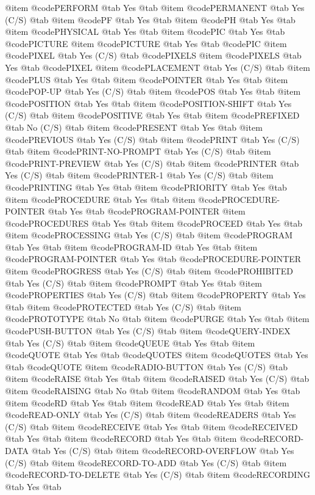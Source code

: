 @item @code{PERFORM} @tab Yes @tab
@item @code{PERMANENT} @tab Yes	(C/S) @tab
@item @code{PF} @tab Yes @tab
@item @code{PH} @tab Yes @tab
@item @code{PHYSICAL} @tab Yes @tab
@item @code{PIC} @tab Yes @tab @code{PICTURE}
@item @code{PICTURE} @tab Yes @tab @code{PIC}
@item @code{PIXEL} @tab Yes	(C/S) @tab @code{PIXELS}
@item @code{PIXELS} @tab Yes @tab @code{PIXEL}
@item @code{PLACEMENT} @tab Yes	(C/S) @tab
@item @code{PLUS} @tab Yes @tab
@item @code{POINTER} @tab Yes @tab
@item @code{POP-UP} @tab Yes	(C/S) @tab
@item @code{POS} @tab Yes @tab
@item @code{POSITION} @tab Yes @tab
@item @code{POSITION-SHIFT} @tab Yes	(C/S) @tab
@item @code{POSITIVE} @tab Yes @tab
@item @code{PREFIXED} @tab No	(C/S) @tab
@item @code{PRESENT} @tab Yes @tab
@item @code{PREVIOUS} @tab Yes	(C/S) @tab
@item @code{PRINT} @tab Yes	(C/S) @tab
@item @code{PRINT-NO-PROMPT} @tab Yes	(C/S) @tab
@item @code{PRINT-PREVIEW} @tab Yes	(C/S) @tab
@item @code{PRINTER} @tab Yes	(C/S) @tab
@item @code{PRINTER-1} @tab Yes	(C/S) @tab
@item @code{PRINTING} @tab Yes @tab
@item @code{PRIORITY} @tab Yes @tab
@item @code{PROCEDURE} @tab Yes @tab
@item @code{PROCEDURE-POINTER} @tab Yes @tab @code{PROGRAM-POINTER}
@item @code{PROCEDURES} @tab Yes @tab
@item @code{PROCEED} @tab Yes @tab
@item @code{PROCESSING} @tab Yes	(C/S) @tab
@item @code{PROGRAM} @tab Yes @tab
@item @code{PROGRAM-ID} @tab Yes @tab
@item @code{PROGRAM-POINTER} @tab Yes @tab @code{PROCEDURE-POINTER}
@item @code{PROGRESS} @tab Yes	(C/S) @tab
@item @code{PROHIBITED} @tab Yes	(C/S) @tab
@item @code{PROMPT} @tab Yes @tab
@item @code{PROPERTIES} @tab Yes	(C/S) @tab
@item @code{PROPERTY} @tab Yes @tab
@item @code{PROTECTED} @tab Yes	(C/S) @tab
@item @code{PROTOTYPE} @tab No @tab
@item @code{PURGE} @tab Yes @tab
@item @code{PUSH-BUTTON} @tab Yes	(C/S) @tab
@item @code{QUERY-INDEX} @tab Yes	(C/S) @tab
@item @code{QUEUE} @tab Yes @tab
@item @code{QUOTE} @tab Yes @tab @code{QUOTES}
@item @code{QUOTES} @tab Yes @tab @code{QUOTE}
@item @code{RADIO-BUTTON} @tab Yes	(C/S) @tab
@item @code{RAISE} @tab Yes @tab
@item @code{RAISED} @tab Yes	(C/S) @tab
@item @code{RAISING} @tab No @tab
@item @code{RANDOM} @tab Yes @tab
@item @code{RD} @tab Yes @tab
@item @code{READ} @tab Yes @tab
@item @code{READ-ONLY} @tab Yes	(C/S) @tab
@item @code{READERS} @tab Yes	(C/S) @tab
@item @code{RECEIVE} @tab Yes @tab
@item @code{RECEIVED} @tab Yes @tab
@item @code{RECORD} @tab Yes @tab
@item @code{RECORD-DATA} @tab Yes	(C/S) @tab
@item @code{RECORD-OVERFLOW} @tab Yes (C/S) @tab
@item @code{RECORD-TO-ADD} @tab Yes	(C/S) @tab
@item @code{RECORD-TO-DELETE} @tab Yes	(C/S) @tab
@item @code{RECORDING} @tab Yes @tab
